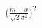 \documentclass[preview]{standalone}
\begin{document}
\begin{align*}
\Big( \frac{m - x}{\sqrt{2} \sigma^2} \Big)^2
\end{align*}
\end{document}
